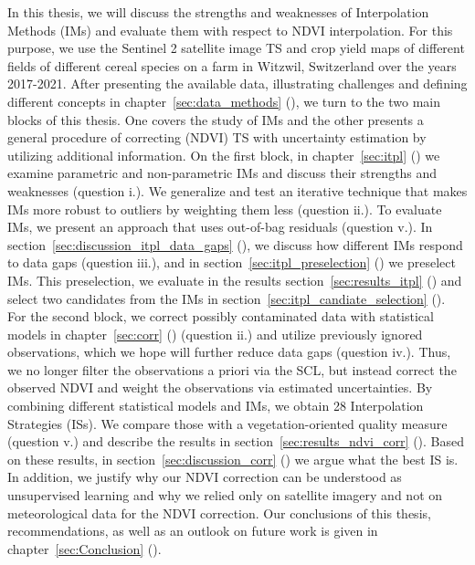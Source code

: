 In this thesis, we will discuss the strengths and weaknesses of Interpolation Methods ({{IM}}s) and evaluate them with respect to NDVI interpolation. For this purpose, we use the Sentinel 2 satellite image {TS} and crop yield maps of different fields of different cereal species on a farm in Witzwil, Switzerland over the years 2017-2021. After presenting the available data, illustrating challenges and defining different concepts in chapter~\ref{sec:data_methods} (), we turn to the two main blocks of this thesis. One covers the study of IMs and the other presents a general procedure of correcting (NDVI) TS with uncertainty estimation by utilizing additional information.
On the first block, in chapter~\ref{sec:itpl} () we examine parametric and non-parametric {{IM}}s and discuss their strengths and weaknesses (question i.). We generalize and test an iterative technique that makes IMs more robust to outliers by weighting them less (question ii.). To evaluate IMs, we present an approach that uses out-of-bag residuals (question v.). In section~\ref{sec:discussion_itpl_data_gaps} (), we discuss how different {{IM}}s respond to data gaps (question iii.), and in section~\ref{sec:itpl_preselection} () we preselect {{IM}}s. This preselection, we evaluate in the results section~\ref{sec:results_itpl} () and select two candidates from the {{IM}}s in section~\ref{sec:itpl_candiate_selection} ().
For the second block, we correct possibly contaminated data with statistical models in chapter~\ref{sec:corr} () (question ii.) and utilize previously ignored observations, which we hope will further reduce data gaps (question iv.). Thus, we no longer filter the observations a priori via the SCL, but instead correct the observed NDVI and weight the observations via estimated uncertainties. By combining different statistical models and IMs, we obtain 28 Interpolation Strategies ({{ISs}}). We compare those with a vegetation-oriented quality measure (question v.) and describe the results in section~\ref{sec:results_ndvi_corr} (). Based on these results, in section~\ref{sec:discussion_corr} () we argue what the best {{IS}} is. In addition, we justify why our NDVI correction can be understood as unsupervised learning and why we relied only on satellite imagery and not on meteorological data for the NDVI correction.
Our conclusions of this thesis, recommendations, as well as an outlook on future work is given in chapter~\ref{sec:Conclusion} (). 








